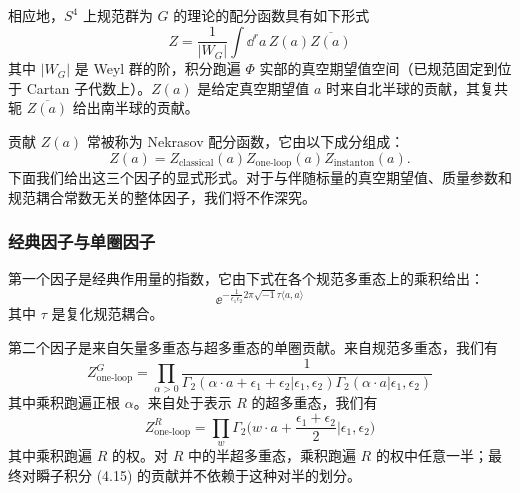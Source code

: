 相应地，$S^4$ 上规范群为 $G$ 的理论的配分函数具有如下形式
\begin{equation}
Z=\frac{1}{|W_G|}\int\dd^r a\,Z(a)\overline{Z(a)}
\tag{4.15}
\end{equation}
其中 $|W_G|$ 是 Weyl 群的阶，积分跑遍 $\Phi$ 实部的真空期望值空间（已规范固定到位于 Cartan 子代数上）。$Z(a)$ 是给定真空期望值 $a$ 时来自北半球的贡献，其复共轭 $\overline{Z(a)}$ 给出南半球的贡献。

贡献 $Z(a)$ 常被称为 Nekrasov 配分函数，它由以下成分组成：
\begin{equation}
Z(a)=Z_{\text{classical}}(a)Z_{\text{one-loop}}(a)Z_{\text{instanton}}(a).
\tag{4.16}
\end{equation}
下面我们给出这三个因子的显式形式。对于与伴随标量的真空期望值、质量参数和规范耦合常数无关的整体因子，我们将不作深究。


\subsubsection{经典因子与单圈因子}

第一个因子是经典作用量的指数，它由下式在各个规范多重态上的乘积给出：
\begin{equation}
\ee^{-\frac{1}{\epsilon_1\epsilon_2}2\pi\sqrt{-1}\tau\langle a,a\rangle}
\tag{4.17}
\end{equation}
其中 $\tau$ 是复化规范耦合。


第二个因子是来自矢量多重态与超多重态的单圈贡献。来自规范多重态，我们有
\begin{equation}
Z^G_{\text{one-loop}}=\prod_{\alpha>0}\frac{1}{\Gamma_2(\alpha\cdot a+\epsilon_1+\epsilon_2|\epsilon_1,\epsilon_2)\Gamma_2(\alpha\cdot a|\epsilon_1,\epsilon_2)}
\tag{4.18}
\end{equation}
其中乘积跑遍正根 $\alpha$。来自处于表示 $R$ 的超多重态，我们有
\begin{equation}
Z^R_{\text{one-loop}}=\prod_w\Gamma_2\Big(w\cdot a+\frac{\epsilon_1+\epsilon_2}{2}\Big|\epsilon_1,\epsilon_2\Big)
\tag{4.19}
\end{equation}
其中乘积跑遍 $R$ 的权。对 $R$ 中的半超多重态，乘积跑遍 $R$ 的权中任意一半；最终对瞬子积分 (4.15) 的贡献并不依赖于这种对半的划分。

